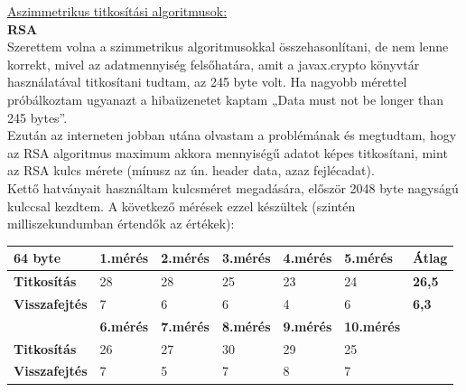 \vspace{25pt} \noindent \underline{Aszimmetrikus titkosítási algoritmusok:}
\vspace{15pt} \\ \textbf{RSA}
\vspace{5pt} \\ Szerettem volna a szimmetrikus algoritmusokkal összehasonlítani, de nem lenne korrekt, mivel az adatmennyiség felsőhatára, amit a javax.crypto könyvtár használatával titkosítani tudtam, az 245 byte volt. Ha nagyobb mérettel próbálkoztam ugyanazt a hibaüzenetet kaptam „Data must not be longer than 245 bytes”.
\vspace{5pt} \\Ezután az interneten jobban utána olvastam a problémának és megtudtam, hogy az RSA algoritmus maximum akkora mennyiségű adatot képes titkosítani, mint az RSA kulcs mérete (mínusz az ún. header data, azaz fejlécadat). 
\vspace{5pt} \\Kettő hatványait használtam kulcsméret megadására, először 2048 byte nagyságú kulccsal kezdtem. A következő mérések ezzel készültek (szintén milliszekundumban értendők az értékek):

\begin{center}
	
	
	\begin{tabular}{|p{2.4cm}|p{1.6cm}|p{1.6cm}|p{1.7cm}|p{1.7cm}|p{1.8cm}|p{1.5cm}|}
		\hline
		\textbf{64 byte} & \textbf{1.mérés} & \textbf{2.mérés} & \textbf{3.mérés} & \textbf{4.mérés} & \textbf{5.mérés} & \textbf{Átlag} \\
		\hline
		\textbf{Titkosítás}&28&28&25&23&24& \textbf{26,5} \\
		\hline
		\textbf{Visszafejtés}&7&6&6&4&6& \textbf{6,3} \\
		\hline
		& \textbf{6.mérés} & \textbf{7.mérés} & \textbf{8.mérés} & \textbf{9.mérés} & \textbf{10.mérés} & \\
		\hline
		\textbf{Titkosítás}&26&27&30&29&25&\\
		\hline
		\textbf{Visszafejtés}&7&5&7&8&7&\\
		\hline
	\end{tabular}
\end{center}

